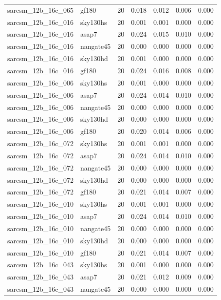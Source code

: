 \begin{tabular}{llrrrrr}
sarcsm\_12b\_16c\_065 & gf180 & 20 & 0.018 & 0.012 & 0.006 & 0.000 \\
sarcsm\_12b\_16c\_016 & sky130hs & 20 & 0.001 & 0.001 & 0.000 & 0.000 \\
sarcsm\_12b\_16c\_016 & asap7 & 20 & 0.024 & 0.015 & 0.010 & 0.000 \\
sarcsm\_12b\_16c\_016 & nangate45 & 20 & 0.000 & 0.000 & 0.000 & 0.000 \\
sarcsm\_12b\_16c\_016 & sky130hd & 20 & 0.001 & 0.000 & 0.000 & 0.000 \\
sarcsm\_12b\_16c\_016 & gf180 & 20 & 0.024 & 0.016 & 0.008 & 0.000 \\
sarcsm\_12b\_16c\_006 & sky130hs & 20 & 0.001 & 0.000 & 0.000 & 0.000 \\
sarcsm\_12b\_16c\_006 & asap7 & 20 & 0.024 & 0.014 & 0.010 & 0.000 \\
sarcsm\_12b\_16c\_006 & nangate45 & 20 & 0.000 & 0.000 & 0.000 & 0.000 \\
sarcsm\_12b\_16c\_006 & sky130hd & 20 & 0.000 & 0.000 & 0.000 & 0.000 \\
sarcsm\_12b\_16c\_006 & gf180 & 20 & 0.020 & 0.014 & 0.006 & 0.000 \\
sarcsm\_12b\_16c\_072 & sky130hs & 20 & 0.001 & 0.001 & 0.000 & 0.000 \\
sarcsm\_12b\_16c\_072 & asap7 & 20 & 0.024 & 0.014 & 0.010 & 0.000 \\
sarcsm\_12b\_16c\_072 & nangate45 & 20 & 0.000 & 0.000 & 0.000 & 0.000 \\
sarcsm\_12b\_16c\_072 & sky130hd & 20 & 0.000 & 0.000 & 0.000 & 0.000 \\
sarcsm\_12b\_16c\_072 & gf180 & 20 & 0.021 & 0.014 & 0.007 & 0.000 \\
sarcsm\_12b\_16c\_010 & sky130hs & 20 & 0.001 & 0.001 & 0.000 & 0.000 \\
sarcsm\_12b\_16c\_010 & asap7 & 20 & 0.024 & 0.014 & 0.010 & 0.000 \\
sarcsm\_12b\_16c\_010 & nangate45 & 20 & 0.000 & 0.000 & 0.000 & 0.000 \\
sarcsm\_12b\_16c\_010 & sky130hd & 20 & 0.000 & 0.000 & 0.000 & 0.000 \\
sarcsm\_12b\_16c\_010 & gf180 & 20 & 0.021 & 0.014 & 0.007 & 0.000 \\
sarcsm\_12b\_16c\_043 & sky130hs & 20 & 0.001 & 0.000 & 0.000 & 0.000 \\
sarcsm\_12b\_16c\_043 & asap7 & 20 & 0.021 & 0.012 & 0.009 & 0.000 \\
sarcsm\_12b\_16c\_043 & nangate45 & 20 & 0.000 & 0.000 & 0.000 & 0.000 \\

\end{tabular}
